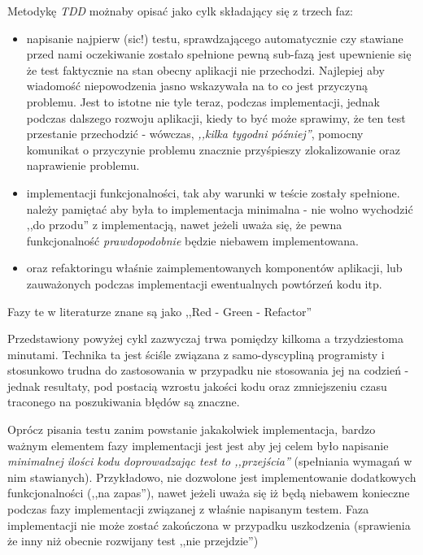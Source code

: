 \documentclass[pdflatex,11pt]{aghdpl}
\begin{document}
Metodykę \textit{TDD} możnaby opisać jako cylk składający się z trzech faz:
\begin{itemize}
 \item napisanie najpierw \small{(sic!)} testu, sprawdzającego automatycznie czy stawiane przed nami oczekiwanie zostało spełnione
 \subitem pewną sub-fazą jest upewnienie się że test faktycznie na stan obecny aplikacji nie przechodzi. Najlepiej aby wiadomość niepowodzenia
          jasno wskazywała na to co jest przyczyną problemu. Jest to istotne nie tyle teraz, podczas implementacji, jednak podczas dalszego rozwoju aplikacji,
          kiedy to być może sprawimy, że ten test przestanie przechodzić - wówczas, \textit{,,kilka tygodni później''}, pomocny komunikat o przyczynie problemu 
          znacznie przyśpieszy zlokalizowanie oraz naprawienie problemu.
 \item implementacji funkcjonalności, tak aby warunki w teście zostały spełnione.
  \subitem należy pamiętać aby była to implementacja minimalna - nie wolno wychodzić ,,do przodu'' z implementacją, nawet jeżeli uważa się,
           że pewna funkcjonalność \textit{prawdopodobnie} będzie niebawem implementowana.
 \item oraz refaktoringu właśnie zaimplementowanych komponentów aplikacji, lub zauważonych podczas implementacji ewentualnych powtórzeń kodu itp.
\end{itemize}

Fazy te w literaturze znane są jako ,,Red - Green - Refactor''

Przedstawiony powyżej cykl zazwyczaj trwa pomiędzy kilkoma a trzydziestoma minutami. Technika ta jest ściśle związana z samo-dyscypliną programisty
i stosunkowo trudna do zastosowania w przypadku nie stosowania jej na codzień - jednak resultaty, pod postacią wzrostu jakości kodu oraz zmniejszeniu 
czasu traconego na poszukiwania błędów są znaczne.

Oprócz pisania testu zanim powstanie jakakolwiek implementacja, bardzo ważnym elementem fazy implementacji jest jest aby jej celem 
było napisanie \textit{minimalnej ilości kodu doprowadzając test to ,,przejścia''} (spełniania wymagań w nim stawianych). Przykładowo, nie dozwolone jest
implementowanie dodatkowych funkcjonalności (,,na zapas''), nawet jeżeli uważa się iż będą niebawem konieczne podczas fazy implementacji związanej 
z właśnie napisanym testem. Faza implementacji nie może zostać zakończona w przypadku uszkodzenia (sprawienia że inny niż obecnie rozwijany test ,,nie przejdzie'')
\end{document}
